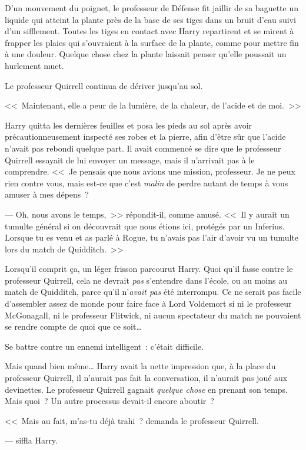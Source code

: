 D'un mouvement du poignet, le professeur de Défense fit jaillir de sa baguette un liquide qui atteint la plante près de la base de ses tiges dans un bruit d'eau suivi d'un sifflement. Toutes les tiges en contact avec Harry repartirent et se mirent à frapper les plaies qui s'ouvraient à la surface de la plante, comme pour mettre fin à une douleur. Quelque chose chez la plante laissait penser qu'elle poussait un hurlement muet.

Le professeur Quirrell continua de dériver jusqu'au sol.

<<~Maintenant, elle a peur de la lumière, de la chaleur, de l'acide et de moi.~>>

Harry quitta les dernières feuilles et posa les pieds au sol après avoir précautionneusement inspecté ses robes et la pierre, afin d'être sûr que l'acide n'avait pas rebondi quelque part. Il avait commencé se dire que le professeur Quirrell essayait de lui envoyer un message, mais il n'arrivait pas à le comprendre. <<~Je pensais que nous avions une mission, professeur. Je ne peux rien contre vous, mais est-ce que c'est \emph{malin} de perdre autant de temps à vous amuser à mes dépens~?

--- Oh, nous avons le temps,~>> répondit-il, comme amusé. <<~Il y aurait un tumulte général si on découvrait que nous étions ici, protégés par un Inferius. Lorsque tu es venu et as parlé à Rogue, tu n'avais pas l'air d'avoir vu un tumulte lors du match de Quidditch.~>>

Lorsqu'il comprit ça, un léger frisson parcourut Harry. Quoi qu'il fasse contre le professeur Quirrell, cela ne devrait \emph{pas} s'entendre dans l'école, ou au moins au match de Quidditch, parce qu'il n'\emph{avait pas} été interrompu. Ce ne serait pas facile d'assembler assez de monde pour faire face à Lord Voldemort si ni le professeur McGonagall, ni le professeur Flitwick, ni aucun spectateur du match ne pouvaient se rendre compte de quoi que ce soit…

Se battre contre un ennemi intelligent~: c'était difficile.

Mais quand bien même… Harry avait la nette impression que, à la place du professeur Quirrell, il n'aurait pas fait la conversation, il n'aurait pas joué aux devinettes. Le professeur Quirrell gagnait \emph{quelque chose} en prenant son temps. Mais quoi~? Un autre processus devait-il encore aboutir~?

<<~Mais au fait, m'as-tu déjà trahi~? demanda le professeur Quirrell.

---  siffla Harry.

